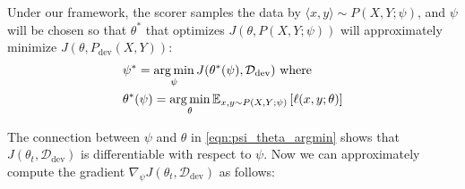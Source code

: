Under our framework, the scorer samples the data by $\langle x, y \rangle \sim P(X, Y; \psi)$, and $\psi$ will be chosen so that $\theta^*$ that optimizes $J(\theta, P(X, Y;\psi))$ will approximately minimize $J(\theta, P_\text{dev}(X,Y))$: 
\begin{equation}
  \label{eqn:psi_theta_argmin}
  \begin{aligned}
   & \psi^* = \operatorname*{arg\,min}_\psi
  J(\theta^*(\psi), \mathcal{D}_\text{dev}) 
    ~\text{where}~ \\
   & \theta^*(\psi) = \operatorname*{arg\,min}_\theta \mathbb{E}_{x, y \sim P(X, Y; \psi)} \left[ \ell(x, y; \theta) \right]
  \end{aligned}
\end{equation}

The connection between $\psi$ and $\theta$ in \autoref{eqn:psi_theta_argmin} shows that $J(\theta_t, \mathcal{D}_\text{dev})$ is differentiable with respect to $\psi$. Now we can approximately compute the gradient $\nabla_\psi J(\theta_t, \mathcal{D}_\text{dev})$ as follows:

